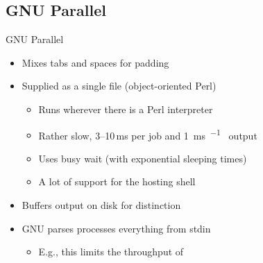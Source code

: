 \subsection{GNU Parallel}
\begin{frame}{GNU Parallel}
   \begin{itemize}[<+(1)->]
      \itemsep8pt
      \item Mixes tabs and spaces for padding~\smash{\raisebox{-2pt}{\resizebox*!{\baselineskip}{\tikz\pingu[wings shock,eyes shock,tie=pingu@black,body type=chubby];}}}
      \item Supplied as a single file (object-oriented Perl)%
      \begin{itemize}
         \item Runs wherever there is a Perl interpreter
         \item Rather slow, 3--10\,\unit{\milli\second} per job and \qty{1}{\milli\second\per\mega\byte} output %
         \item Uses busy wait (with exponential sleeping times)%
         \item A lot of support for the hosting shell %
      \end{itemize}
   \item Buffers output on disk for distinction
   \item GNU \LogoParallel parses processes everything from stdin \begin{itemize}
      \item E.g., this limits the throughput of 
   \end{itemize} %
   \end{itemize}
\end{frame}
\SidebarReset

